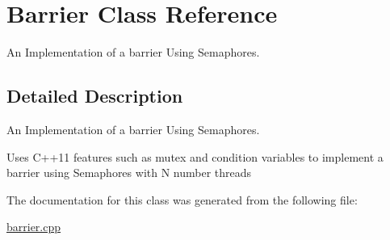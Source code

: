 \hypertarget{class_barrier}{}\section{Barrier Class Reference}
\label{class_barrier}


An Implementation of a barrier Using Semaphores.  




\subsection{Detailed Description}
An Implementation of a barrier Using Semaphores. 

Uses C++11 features such as mutex and condition variables to implement a barrier using Semaphores with N number threads 

The documentation for this class was generated from the following file\+:\begin{DoxyCompactItemize}
\item 
\hyperlink{barrier_8cpp}{barrier.\+cpp}\end{DoxyCompactItemize}
